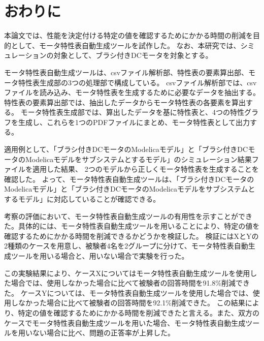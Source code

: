 \chapter{おわりに}\label{cha:Conclusion}
本論文では、性能を決定付ける特定の値を確認するためにかかる時間の削減を目的として、モータ特性表自動生成ツールを試作した。
なお、本研究では、シミュレーションの対象として、ブラシ付きDCモータを対象とする。

モータ特性表自動生成ツールは、csvファイル解析部、特性表の要素算出部、モータ特性表生成部の3つの処理部で構成している。
csvファイル解析部では、csvファイルを読み込み、モータ特性表を生成するために必要なデータを抽出する。特性表の要素算出部では、抽出したデータからモータ特性表の各要素を算出する。
モータ特性表生成部では、算出したデータを基に特性表と、4つの特性グラフを生成し、これらを1つのPDFファイルにまとめ、モータ特性表として出力する。

適用例として、「ブラシ付きDCモータのModelicaモデル」と「ブラシ付きDCモータのModelicaモデルをサブシステムとするモデル」のシミュレーション結果ファイルを適用した結果、
2つのモデルから正しくモータ特性表を生成することを確認した。
よって、モータ特性表自動生成ツールは、「ブラシ付きDCモータのModelicaモデル」と「ブラシ付きDCモータのModelicaモデルをサブシステムとするモデル」に対応していることが確認できる。

考察の評価において、モータ特性表自動生成ツールの有用性を示すことができた。具体的には、モータ特性表自動生成ツールを用いることにより、特定の値を確認するためにかかる時間を削減できるかどうかを検証した。
検証にはXとYの2種類のケースを用意し、被験者4名を2グループに分けて、モータ特性表自動生成ツールを用いる場合と、用いない場合で実験を行った。

この実験結果により、ケースXについてはモータ特性表自動生成ツールを使用した場合では、使用しなかった場合に比べて被験者の回答時間を91.8\%削減できた。
ケースYについては、モータ特性表自動生成ツールを使用した場合では、使用しなかった場合に比べて被験者の回答時間を92.1\%削減できた。
この結果により、特定の値を確認するためにかかる時間を削減できたと言える。また、双方のケースでモータ特性表自動生成ツールを用いた場合、モータ特性表自動生成ツールを用いない場合に比べ、問題の正答率が上昇した。


